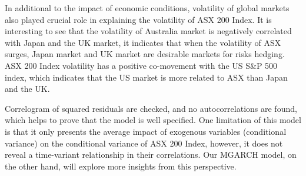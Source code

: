 \documentclass[11pt]{article}
\begin{document}
In additional to the impact of economic conditions, volatility of global markets also played crucial role in explaining the volatility of ASX 200 Index. It is interesting to see that the volatility of Australia market is negatively correlated with Japan and the UK market, it indicates that when the volatility of ASX surges, Japan market and UK market are desirable markets for risks hedging. ASX 200 Index volatility has a positive co-movement with the US S\&P 500 index, which indicates that the US market is more related to ASX than Japan and the UK. 

Correlogram of squared residuals are checked, and no autocorrelations are found, which helps to prove that the model is well specified. One limitation of this model is that it only presents the average impact of exogenous variables (conditional variance) on the conditional variance of ASX 200 Index, however, it does not reveal a time-variant relationship in their correlations. Our MGARCH model, on the other hand, will explore more insights from this perspective.
\end{document}
